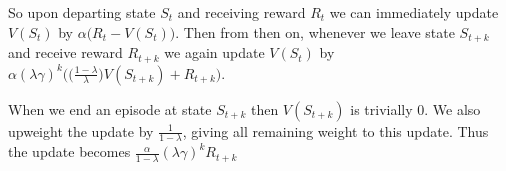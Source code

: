 \documentclass[11pt]{article}
\begin{document}
So upon departing state $S_t$ and receiving reward $R_t$ we can immediately update $V(S_t)$ by $\alpha\big(R_t - V(S_t)\big)$.
Then from then on, whenever we leave state $S_{t+k}$ and receive reward $R_{t +k}$ we again update $V(S_t)$ by
$\alpha (\lambda \gamma)^k \bigg(\big(\frac{1 - \lambda}{\lambda}\big)V(S_{t+k}) + R_{t+k} \bigg)$.

When we end an episode at state $S_{t+k}$ then $V(S_{t+k})$ is trivially 0.
We also upweight the update by $\frac{1}{1 - \lambda}$, giving all remaining weight to this update.
Thus the update becomes $\frac{\alpha}{1 - \lambda} (\lambda \gamma)^k R_{t+k}$
\end{document}
